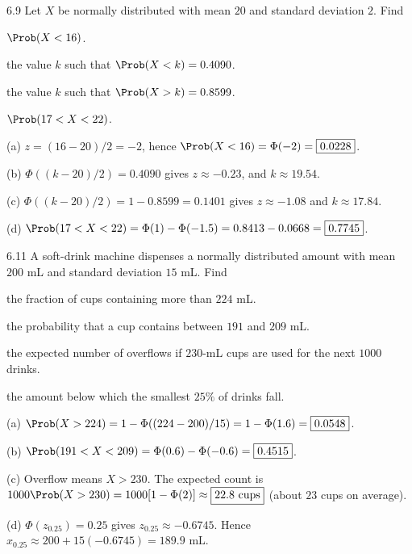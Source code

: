 \documentclass[11pt,oneside]{article}
\begin{document}

\begin{exercise}{6.9}
Let $X$ be normally distributed with mean $20$ and standard deviation $2$. Find
\begin{exercisesubparts}
\item $\Prob(X<16)$.
\item the value $k$ such that $\Prob(X<k)=0.4090$.
\item the value $k$ such that $\Prob(X>k)=0.8599$.
\item $\Prob(17<X<22)$.
\end{exercisesubparts}
\end{exercise}

\begin{solution}
\noindent\textup{(a)} $z=(16-20)/2=-2$, hence $\Prob(X<16)=\Phi(-2)=\boxed{0.0228}$.

\noindent\textup{(b)} $\Phi((k-20)/2)=0.4090$ gives $z\approx-0.23$, and $\boxed{k\approx19.54}$.

\noindent\textup{(c)} $\Phi((k-20)/2)=1-0.8599=0.1401$ gives $z\approx-1.08$ and $\boxed{k\approx17.84}$.

\noindent\textup{(d)} $\Prob(17<X<22)=\Phi(1)-\Phi(-1.5)=0.8413-0.0668=\boxed{0.7745}$.
\end{solution}

\begin{exercise}{6.11}
A soft-drink machine dispenses a normally distributed amount with mean $200$ mL and standard deviation $15$ mL. Find
\begin{exercisesubparts}
\item the fraction of cups containing more than $224$ mL.
\item the probability that a cup contains between $191$ and $209$ mL.
\item the expected number of overflows if $230$-mL cups are used for the next $1000$ drinks.
\item the amount below which the smallest $25\%$ of drinks fall.
\end{exercisesubparts}
\end{exercise}

\begin{solution}
\noindent\textup{(a)} $\Prob(X>224)=1-\Phi((224-200)/15)=1-\Phi(1.6)=\boxed{0.0548}$.

\noindent\textup{(b)} $\Prob(191<X<209)=\Phi(0.6)-\Phi(-0.6)=\boxed{0.4515}$.

\noindent\textup{(c)} Overflow means $X>230$. The expected count is $1000\Prob(X>230)=1000[1-\Phi(2)]\approx\boxed{22.8\text{ cups}}$ (about $23$ cups on average).

\noindent\textup{(d)} $\Phi(z_{0.25})=0.25$ gives $z_{0.25}\approx-0.6745$. Hence $\boxed{x_{0.25}\approx200+15(-0.6745)=189.9\text{ mL}}$.
\end{solution}
\end{document}
